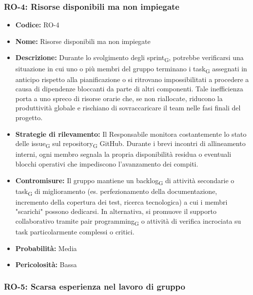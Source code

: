 \documentclass[a4paper, 10pt, colorlinks=true, linkcolor=black, urlcolor=blue, citecolor=blue, hidelinks]{article}
\begin{document}
\subsubsection{RO-4: Risorse disponibili ma non impiegate}
\begin{itemize}
    \item \textbf{Codice:} RO-4
    \item \textbf{Nome:} Risorse disponibili ma non impiegate

    \item \textbf{Descrizione:} Durante lo svolgimento degli sprint\textsubscript{G}, potrebbe verificarsi una situazione in cui uno o più membri del gruppo terminano i task\textsubscript{G} assegnati in anticipo rispetto alla pianificazione o si ritrovano impossibilitati a procedere a causa di dipendenze bloccanti da parte di altri componenti. Tale inefficienza porta a uno spreco di risorse orarie che, se non riallocate, riducono la produttività globale e rischiano di sovraccaricare il team nelle fasi finali del progetto.

    \item \textbf{Strategie di rilevamento:} Il Responsabile monitora costantemente lo stato delle issue\textsubscript{G} sul repository\textsubscript{G} GitHub. Durante i brevi incontri di allineamento interni, ogni membro segnala la propria disponibilità residua o eventuali blocchi operativi che impediscono l'avanzamento dei compiti.

    \item \textbf{Contromisure:} Il gruppo mantiene un backlog\textsubscript{G} di attività secondarie o task\textsubscript{G} di miglioramento (es. perfezionamento della documentazione, incremento della copertura dei test, ricerca tecnologica) a cui i membri "scarichi" possono dedicarsi. In alternativa, si promuove il supporto collaborativo tramite pair programming\textsubscript{G} o attività di verifica incrociata su task particolarmente complessi o critici.

    \item \textbf{Probabilità:} Media

    \item \textbf{Pericolosità:} Bassa
\end{itemize}

\subsubsection{RO-5: Scarsa esperienza nel lavoro di gruppo}
\end{document}
